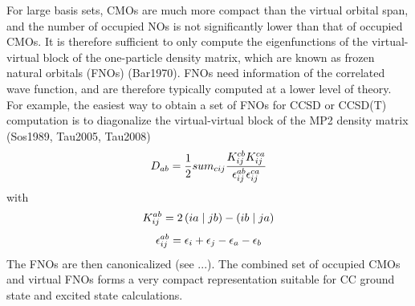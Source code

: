 For large basis sets, CMOs are much more compact than the virtual orbital span, and the number of occupied NOs is not significantly lower than that of occupied CMOs. It is therefore sufficient to only compute the eigenfunctions of the virtual-virtual block of the one-particle density matrix, which are known as frozen natural orbitals (FNOs) (Bar1970). FNOs need information of the correlated wave function, and are therefore typically computed at a lower level of theory. For example, the easiest way to obtain a set of FNOs for CCSD or CCSD(T) computation is to diagonalize the virtual-virtual block  of the MP2 density matrix (Sos1989, Tau2005, Tau2008)
\begin{equation}
D_{ab} = \frac{1}{2} sum_{cij} \frac{K_{ij}^{cb} K_{ij}^{ca}}{\epsilon_{ij}^{ab} \epsilon_{ij}^{ca}}
\end{equation}
\noindent with
\begin{equation}
K_{ij}^{ab} = 2 \left( ia \mid jb \right) - \left( ib \mid ja \right)
\end{equation}
\begin{equation}
\epsilon_{ij}^{ab} = \epsilon_i + \epsilon_j - \epsilon_a - \epsilon_b 
\end{equation}
The FNOs are then canonicalized (see ...). The combined set of occupied CMOs and virtual FNOs forms a very compact representation suitable for CC ground state and excited state calculations.





